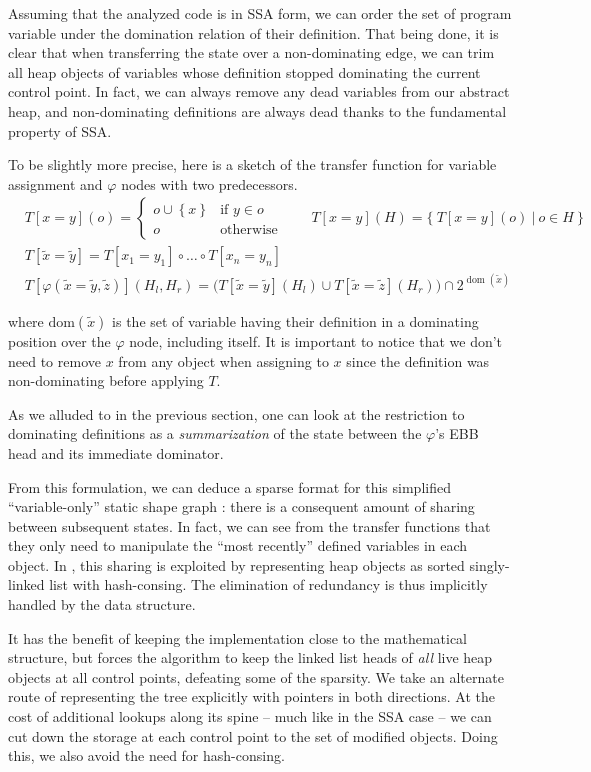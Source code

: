 \documentclass[11pt]{article}
\renewcommand{\phi}{\varphi}
\DeclareMathOperator{\dom}{dom}
\begin{document}
Assuming that the analyzed code is in SSA form, we can order the set of program variable under the domination relation of their definition.
That being done, it is clear that when transferring the state over a non-dominating edge, we can trim all heap objects of variables whose definition stopped dominating the current control point. In fact, we can always remove any dead variables from our abstract heap, and non-dominating definitions are always dead thanks to the fundamental property of SSA.

To be slightly more precise, here is a sketch of the transfer function for variable assignment and $\phi$ nodes with two predecessors.
\[
\begin{aligned}
&T[x=y](o) = \begin{cases}
o \cup \left\{ x \right\} & \text{if } y \in o \\
o & \text{otherwise}
\end{cases}
\qquad
T[x=y](H) = \Big\{~T[x=y](o)~|~o \in H~\Big\} \\
& T[\tilde{x}=\tilde{y}] = T[x_1=y_1]\circ\dots\circ T[x_n=y_n] \\
&T[\phi(\tilde{x}=\tilde{y},\tilde{z})](H_l,H_r) = \big( T[\tilde{x}=\tilde{y}](H_l)\cup T[\tilde{x}=\tilde{z}](H_r) \big)\cap 2^{\dom(\tilde{x})}
\end{aligned}
\]

where $\text{dom}(\tilde{x})$ is the set of variable having their definition in a dominating position over the $\phi$ node, including itself. It is important to notice that we don't need to remove $x$ from any object when assigning to $x$ since the definition was non-dominating before applying $T$.

As we alluded to in the previous section, one can look at the restriction to dominating definitions as a \emph{summarization} of the state between the $\phi$'s EBB head and its immediate dominator.

From this formulation, we can deduce a sparse format for this simplified ``variable-only'' static shape graph : there is a consequent amount of sharing between subsequent states. In fact, we can see from the transfer functions that they only need to manipulate the ``most recently'' defined variables in each object.
In \cite{ssa-alias}, this sharing is exploited by representing heap objects as sorted singly-linked list with hash-consing. The elimination of redundancy is thus implicitly handled by the data structure.

It has the benefit of keeping the implementation close to the mathematical structure, but forces the algorithm to keep the linked list heads of \emph{all} live heap objects at all control points, defeating some of the sparsity.
We take an alternate route of representing the tree explicitly with pointers in both directions. At the cost of additional lookups along its spine -- much like in the SSA case -- we can cut down the storage at each control point to the set of modified objects. Doing this, we also avoid the need for hash-consing.
\end{document}
